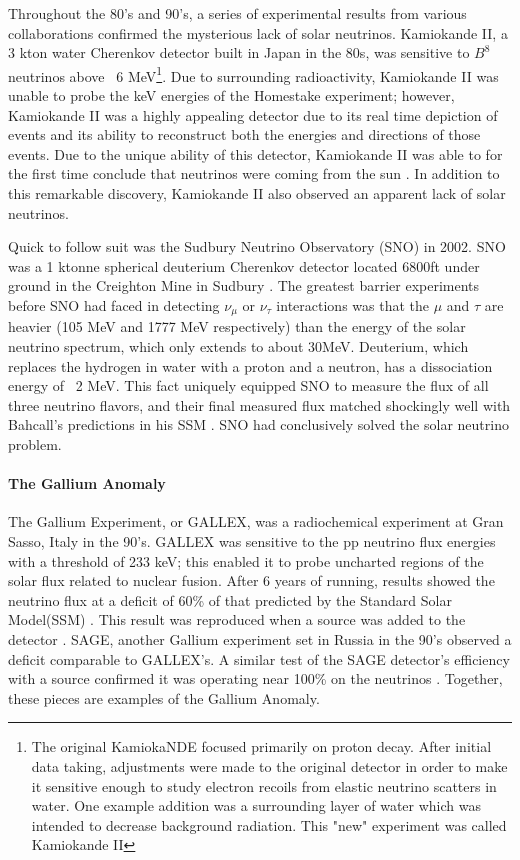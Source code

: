\documentclass[12pt]{article}
\begin{document}
\par Throughout the 80's and 90's, a series of experimental results from various collaborations confirmed the mysterious lack of solar neutrinos. Kamiokande II, a 3 kton water Cherenkov detector built in Japan in the 80s, was sensitive to $B^8$ neutrinos above ~6 MeV\footnote{The original KamiokaNDE focused primarily on proton decay. After initial data taking, adjustments were made to the original detector in order to make it sensitive enough to study electron recoils from elastic neutrino scatters in water. One example addition was a surrounding layer of water which was intended to decrease background radiation.  This "new" experiment was called Kamiokande II}. Due to surrounding radioactivity, Kamiokande II was unable to probe the keV energies of the Homestake experiment; however, Kamiokande II was a highly appealing detector due to its real time depiction of events and its ability to reconstruct both the energies and directions of those events. Due to the unique ability of this detector, Kamiokande II was able to for the first time conclude that neutrinos were coming from the sun \cite{kam0}.  In addition to this remarkable discovery, Kamiokande II also observed an apparent lack of solar neutrinos.
\par Quick to follow suit was the Sudbury Neutrino Observatory (SNO) in 2002.  SNO was a 1 ktonne spherical deuterium Cherenkov detector located 6800ft under ground in the Creighton Mine in Sudbury \cite{sno}. The greatest barrier experiments before SNO had faced in detecting $\nu_\mu$ or $\nu_\tau$ interactions was that the $\mu$ and $\tau$ are heavier (105 MeV and 1777 MeV respectively) than the energy of the solar neutrino spectrum, which only extends to about 30MeV. Deuterium, which replaces the hydrogen in water with a proton and a neutron, has a dissociation energy of ~2 MeV. This fact uniquely equipped SNO to measure the flux of all three neutrino flavors, and their final measured flux matched shockingly well with Bahcall's predictions in his SSM \cite{sno}.  SNO had conclusively solved the solar neutrino problem.  
\paragraph{The Gallium Anomaly} The Gallium Experiment, or GALLEX, was a radiochemical experiment at Gran Sasso, Italy in the 90's. GALLEX was sensitive to the pp neutrino flux energies with a threshold of 233 keV; this enabled it to probe uncharted regions of the solar flux related to nuclear fusion. After 6 years of running, results showed the neutrino flux at a deficit of 60\% of that predicted by the Standard Solar Model(SSM) \cite{gal0}. This result was reproduced when a  source was added to the detector \cite{gal2}. SAGE, another Gallium experiment set in Russia in the 90's observed a deficit comparable to GALLEX's.  A similar test of the SAGE detector's efficiency with a  source confirmed it was operating near 100\% on the  neutrinos \cite{sage}.  Together, these pieces are examples of the Gallium Anomaly.  
\end{document}
